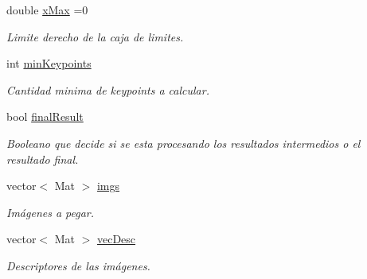 \begin{DoxyCompactItemize}
\mbox{\label{classuav_1_1Stitcher_a20838e1362253194087dad4602a2fd94}} 
double \mbox{\hyperlink{classuav_1_1Stitcher_a20838e1362253194087dad4602a2fd94}{x\+Max}} =0
\begin{DoxyCompactList}\small\item\em Limite derecho de la caja de limites. \end{DoxyCompactList}\item 
\mbox{\label{classuav_1_1Stitcher_a3b54e9be9bda44c4a04b14a645bd9521}} 
int \mbox{\hyperlink{classuav_1_1Stitcher_a3b54e9be9bda44c4a04b14a645bd9521}{min\+Keypoints}}
\begin{DoxyCompactList}\small\item\em Cantidad minima de keypoints a calcular. \end{DoxyCompactList}\item 
\mbox{\label{classuav_1_1Stitcher_af9e17d1709ac39044b31555d75b9bb54}} 
bool \mbox{\hyperlink{classuav_1_1Stitcher_af9e17d1709ac39044b31555d75b9bb54}{final\+Result}}
\begin{DoxyCompactList}\small\item\em Booleano que decide si se esta procesando los resultados intermedios o el resultado final. \end{DoxyCompactList}\item 
\mbox{\label{classuav_1_1Stitcher_af0c6f4217fb85386b4af03330997d960}} 
vector$<$ Mat $>$ \mbox{\hyperlink{classuav_1_1Stitcher_af0c6f4217fb85386b4af03330997d960}{imgs}}
\begin{DoxyCompactList}\small\item\em Imágenes a pegar. \end{DoxyCompactList}\item 
\mbox{\label{classuav_1_1Stitcher_a742222e7b42e4ccfcda30eea161d1f02}} 
vector$<$ Mat $>$ \mbox{\hyperlink{classuav_1_1Stitcher_a742222e7b42e4ccfcda30eea161d1f02}{vec\+Desc}}
\begin{DoxyCompactList}\small\item\em Descriptores de las imágenes. \end{DoxyCompactList}\item 
\mbox{\label{classuav_1_1Stitcher_a1fad5b1dfd31fa5a9ec63b41b6e6eda1}} 

\end{DoxyCompactItemize}
